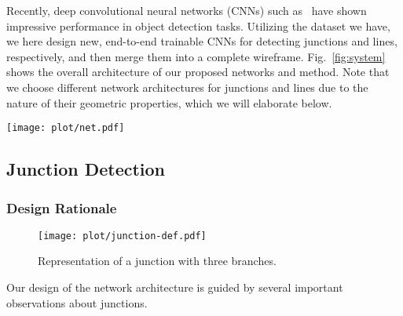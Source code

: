 \documentclass[10pt,twocolumn,letterpaper]{article}
\begin{document}
Recently, deep convolutional neural networks (CNNs) such as~\cite{SermanetEZMFL13, RenHGS15, RedmonF16} have shown impressive performance in object detection tasks. Utilizing the dataset we have, we here design new, end-to-end trainable CNNs for detecting junctions and lines, respectively, and then merge them into a complete wireframe. Fig.~\ref{fig:system} shows the overall architecture of our proposed networks and method. Note that we choose different network architectures for junctions and lines due to the nature of their geometric properties, which we will elaborate below.

\begin{figure*}[t]
	\centering
	\texttt{[image: plot/net.pdf]}
	\caption{Architecture of the overall system. {\bf Top:} junction detection network. {\bf Bottom:} line detection network.} \vspace{-5mm}
	\label{fig:system}
\end{figure*}

\subsection{Junction Detection}

\subsubsection{Design Rationale} \vspace{-2mm}

\begin{figure}[t]
\centering
\texttt{[image: plot/junction-def.pdf]}\vspace{-1mm}
\caption{Representation of a junction with three branches. \vspace{-5mm}}
\label{fig:model}
\end{figure}

Our design of the network architecture is guided by several important observations about junctions.
\end{document}
